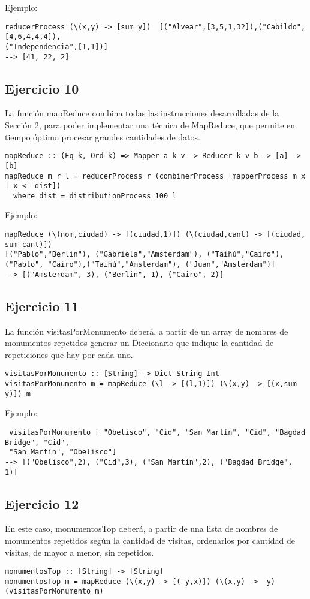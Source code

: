 \documentclass[10pt, a4paper,english,spanish,hidelinks]{article}
\begin{document}
Ejemplo:
\begin{verbatim}
reducerProcess (\(x,y) -> [sum y])  [("Alvear",[3,5,1,32]),("Cabildo",[4,6,4,4,4]),
("Independencia",[1,1])] 
--> [41, 22, 2]
\end{verbatim}
      

\subsection{Ejercicio 10}
La función mapReduce combina todas las instrucciones desarrolladas de la Sección 2, para poder implementar una técnica de MapReduce, que permite en tiempo óptimo procesar grandes cantidades de datos.
\begin{verbatim}
mapReduce :: (Eq k, Ord k) => Mapper a k v -> Reducer k v b -> [a] -> [b]
mapReduce m r l = reducerProcess r (combinerProcess [mapperProcess m x | x <- dist])
  where dist = distributionProcess 100 l
\end{verbatim}

Ejemplo:
\begin{verbatim}
mapReduce (\(nom,ciudad) -> [(ciudad,1)]) (\(ciudad,cant) -> [(ciudad, sum cant)])
[("Pablo","Berlin"), ("Gabriela","Amsterdam"), ("Taihú","Cairo"), ("Pablo", "Cairo"),("Taihú","Amsterdam"), ("Juan","Amsterdam")] 
--> [("Amsterdam", 3), ("Berlin", 1), ("Cairo", 2)]
 \end{verbatim}

\subsection{Ejercicio 11}
La función visitasPorMonumento deberá, a partir de un array de nombres de monumentos repetidos generar un Diccionario que indique la cantidad de repeticiones que hay por cada uno. 
\begin{verbatim}
visitasPorMonumento :: [String] -> Dict String Int
visitasPorMonumento m = mapReduce (\l -> [(l,1)]) (\(x,y) -> [(x,sum y)]) m
\end{verbatim}

Ejemplo:
\begin{verbatim}
 visitasPorMonumento [ "Obelisco", "Cid", "San Martín", "Cid", "Bagdad Bridge", "Cid", 
 "San Martín", "Obelisco"] 
--> [("Obelisco",2), ("Cid",3), ("San Martín",2), ("Bagdad Bridge", 1)]
\end{verbatim}
 

\subsection{Ejercicio 12}
En este caso, monumentosTop deberá, a partir de una lista de nombres de monumentos repetidos según la cantidad de visitas, ordenarlos por cantidad de visitas, de mayor a menor, sin repetidos. 
\begin{verbatim}
monumentosTop :: [String] -> [String]
monumentosTop m = mapReduce (\(x,y) -> [(-y,x)]) (\(x,y) ->  y) (visitasPorMonumento m)
\end{verbatim}
\end{document}
